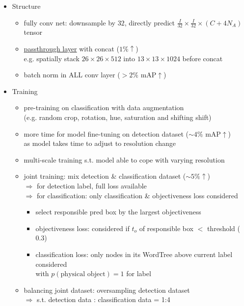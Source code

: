 \begin{itemize}
\begin{itemize}
\begin{itemize}
		\end{itemize}
	\item Structure
		\begin{itemize}
		\item fully conv net: downsample by $32$, directly predict $\frac I{32}\times \frac I{32}\times (C+4N_A)$ tensor
		\item \hyperref[DL_Block_Res_Passthrough]{passthrough layer} with concat ($1\%\uparrow$) \\
		e.g. spatially stack $26\times26\times512$ into $13\times13\times1024$ before concat
		\item batch norm in ALL conv layer ($>2\%$ mAP$\uparrow$)
		\end{itemize}
	\item Training
		\begin{itemize}
		\item pre-training on classification with data augmentation \\
		(e.g. random crop, rotation, hue, saturation and shifting shift)
		\item more time for model fine-tuning on detection dataset ($\sim4\%$ mAP$\uparrow$) \\ 
		as model takes time to adjust to resolution change
		\item multi-scale training s.t. model able to cope with varying resolution
		\item joint training: mix detection \& classification dataset ($\sim5\%\uparrow$) \\
		$\Rightarrow$ for detection label, full loss available \\
		$\Rightarrow$ for classification: only classification \& objectiveness loss considered
			\begin{itemize}
			\item select responsible pred box by the largest objectiveness
			\item objectiveness loss: considered if $t_o$ of responsible box $<$ threshold ($0.3$)
			\item classification loss: only nodes in its WordTree above current label considered \\
			with $p(\text{physical object})=1$ for label
			\end{itemize}
		\item balancing joint dataset: oversampling detection dataset \\
		$\Rightarrow$ s.t. detection data : classification data = 1:4 
		\end{itemize}

\end{itemize}
\end{itemize}
